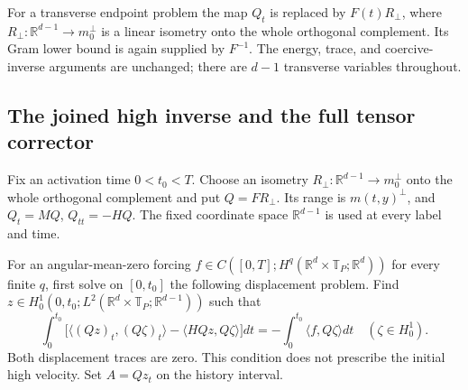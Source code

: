 \documentclass[11pt]{article}
\newcommand{\R}{\mathbb R}
\theoremstyle{definition}
\begin{document}
For a transverse
endpoint problem the map $Q_t$ is replaced by $F(t)R_\perp$, where
$R_\perp:\R^{d-1}\to m_0^\perp$ is a linear isometry onto the whole
orthogonal complement. Its Gram lower bound is again supplied by
$F^{-1}$. The energy, trace, and coercive-inverse arguments are unchanged;
there are $d-1$ transverse variables throughout.

\subsection{The joined high inverse and the full tensor corrector}
Fix an activation time $0<t_0<T$. Choose an isometry
$R_\perp:\R^{d-1}\to m_0^\perp$ onto the whole orthogonal complement
and put $Q=FR_\perp$. Its range is $m(t,y)^\perp$, and
$Q_t=MQ$, $Q_{tt}=-HQ$. The fixed coordinate space $\R^{d-1}$ is used at
every label and time.

For an angular-mean-zero forcing
$f\in C([0,T];H^q(\R^d\times\mathbb T_P;\R^d))$ for every finite $q$,
first solve on $[0,t_0]$ the following displacement problem. Find
$z\in H^1_0(0,t_0;L^2(\R^d\times\mathbb T_P;\R^{d-1}))$ such that
\begin{equation}\label{eq:packet-high-history}
 \int_0^{t_0}\!\bigl[\langle (Qz)_t,(Q\zeta)_t\rangle
            -\langle HQz,Q\zeta\rangle\bigr]dt
       =-\int_0^{t_0}\!\langle f,Q\zeta\rangle dt
 \quad(\zeta\in H^1_0).
\end{equation}
Both displacement traces are zero. This condition does not prescribe the
initial high velocity. Set $A=Qz_t$ on the history interval.
\end{document}
